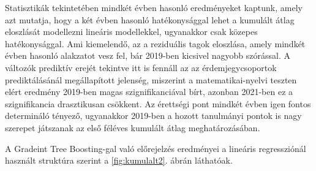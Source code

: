 \documentclass[12pt]{article}
\begin{document}
\noindent Statisztikák tekintetében mindkét évben hasonló eredményeket kaptunk, amely azt mutatja, hogy a két évben hasonló hatékonysággal lehet a kumulált átlag eloszlását modellezni lineáris modellekkel, ugyanakkor csak közepes hatékonysággal. Ami kiemelendő, az a reziduális tagok eloszlása, amely mindkét évben hasonló alakzatot vesz fel, bár 2019-ben kicsivel nagyobb szórással. A változók prediktív erejét tekintve itt is fennáll az az érdemjegycsoportok prediktálásánál megállapított jelenség, miszerint a matematikai-nyelvi teszten elért eredmény 2019-ben magas szignifikanciával bírt, azonban 2021-ben ez a szignifikancia drasztikusan csökkent. Az érettségi pont mindkét évben igen fontos determináló tényező, ugyanakkor 2019-ben a hozott tanulmányi pontok is nagy szerepet játszanak az első féléves kumulált átlag meghatározásában.

A Gradeint Tree Boosting-gal való előrejelzés eredményei a lineáris regressziónál használt struktúra szerint a \ref{fig:kumulalt2}. ábrán láthatóak. 
\end{document}

